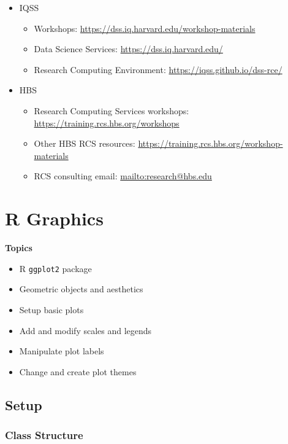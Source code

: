 \documentclass[
]{book}
\providecommand{\tightlist}{%
  \setlength{\itemsep}{0pt}\setlength{\parskip}{0pt}}
\begin{document}
\begin{itemize}
\tightlist
\item
  IQSS

  \begin{itemize}
  \tightlist
  \item
    Workshops: \url{https://dss.iq.harvard.edu/workshop-materials}
  \item
    Data Science Services: \url{https://dss.iq.harvard.edu/}
  \item
    Research Computing Environment: \url{https://iqss.github.io/dss-rce/}
  \end{itemize}
\item
  HBS

  \begin{itemize}
  \tightlist
  \item
    Research Computing Services workshops: \url{https://training.rcs.hbs.org/workshops}
  \item
    Other HBS RCS resources: \url{https://training.rcs.hbs.org/workshop-materials}
  \item
    RCS consulting email: \url{mailto:research@hbs.edu}
  \end{itemize}
\end{itemize}

\hypertarget{r-graphics}{%
\chapter{R Graphics}\label{r-graphics}}

\textbf{Topics}

\begin{itemize}
\tightlist
\item
  R \texttt{ggplot2} package
\item
  Geometric objects and aesthetics
\item
  Setup basic plots
\item
  Add and modify scales and legends
\item
  Manipulate plot labels
\item
  Change and create plot themes
\end{itemize}

\hypertarget{setup-2}{%
\section{Setup}\label{setup-2}}

\hypertarget{class-structure-2}{%
\subsection{Class Structure}\label{class-structure-2}}
\end{document}
